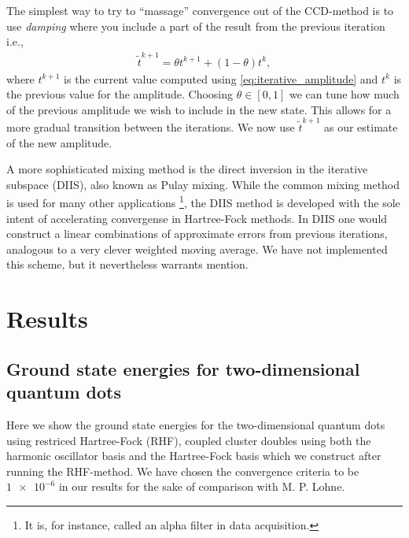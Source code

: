 \documentclass[
    a4paper, aps, twocolumn, floatfix, superscriptaddress,
    nofootinbib]{revtex4-1}
\newcommand{\1}{\mathds{1}}
\begin{document}
        The simplest way to try to ``massage'' convergence out of the CCD-method 
        is to use \emph{damping} where you include a part of the result from the
        previous iteration i.e.,
        \begin{align}
            \tilde{t}^{k + 1} = \theta t^{k + 1} + (1 - \theta)t^k,
            \label{eq:mixing}
        \end{align}
        where $t^{k + 1}$ is the current value computed using
        \autoref{eq:iterative_amplitude} and $t^k$ is the previous value for the
        amplitude. Choosing $\theta \in [0, 1]$ we can tune how much of the
        previous amplitude we wish to include in the new state. This allows for
        a more gradual transition between the iterations. We now use
        $\tilde{t}^{k + 1}$ as our estimate of the new amplitude.

        A more sophisticated mixing method is the direct inversion 
        in the iterative subspace (DIIS), also known as Pulay mixing. While the
        common mixing method is used for many other applications
        \footnote{It is, for instance, called an alpha filter in data acquisition.},
        the DIIS method is developed with the sole intent of accelerating
        convergense in Hartree-Fock methods. In DIIS one would construct a
        linear combinations of approximate errors from previous iterations,
        analogous to a very clever weighted moving average. We have not implemented
        this scheme, but it nevertheless warrants mention.

\section{Results}

    \subsection{Ground state energies for two-dimensional quantum dots}
        Here we show the ground state energies for the two-dimensional quantum
        dots using restriced Hartree-Fock (RHF), coupled cluster doubles using
        both the harmonic oscillator basis and the Hartree-Fock basis which we
        construct after running the RHF-method. We have chosen the convergence
        criteria to be $\num{1e-6}$ in our results for the sake of comparison
        with M. P. Lohne\cite{lohne2011ab}.

\end{document}
